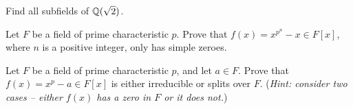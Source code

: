 \begin{problem}
    Find all subfields of $\mathbb{Q}(\sqrt2)$.
\end{problem}

\begin{problem}
    Let $F$ be a field of prime characteristic $p$. Prove that $f(x) = x^{p^n} - x \in F[x]$, where $n$ is a positive integer, only has simple zeroes.
\end{problem}

\begin{problem}
    Let $F$ be a field of prime characteristic $p$, and let $a \in F$. Prove that $f(x) = x^p - a \in F[x]$ is either irreducible or splits over $F$.\newline
    (\textit{Hint: consider two cases -- either $f(x)$ has a zero in $F$ or it does not.})
\end{problem}
